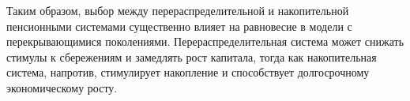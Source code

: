 Таким образом, выбор между перераспределительной и накопительной пенсионными системами существенно влияет на равновесие в модели с 
перекрывающимися поколениями. Перераспределительная система может снижать стимулы к сбережениям и замедлять рост капитала, тогда
 как накопительная система, напротив, стимулирует накопление и способствует долгосрочному экономическому росту.
